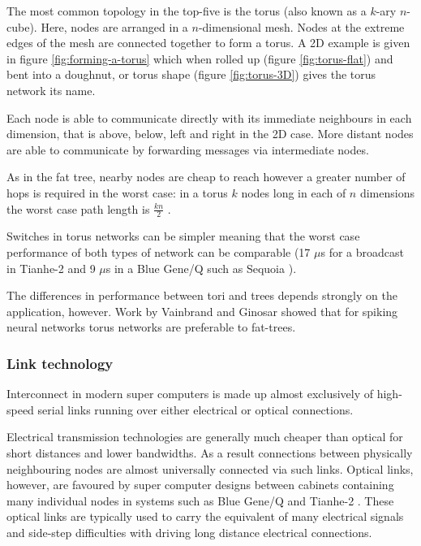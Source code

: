 				The most common topology in the top-five is the torus (also known as a
				$k$-ary $n$-cube). Here, nodes are arranged in a $n$-dimensional mesh.
				Nodes at the extreme edges of the mesh are connected together to form a
				torus. A 2D example is given in figure \ref{fig:forming-a-torus} which
				when rolled up (figure \ref{fig:torus-flat}) and bent into a doughnut,
				or torus shape (figure \ref{fig:torus-3D}) gives the torus network its
				name.
				
				Each node is able to communicate directly with its immediate neighbours
				in each dimension, that is above, below, left and right in the 2D case.
				More distant nodes are able to communicate by forwarding messages via
				intermediate nodes.
				
				As in the fat tree, nearby nodes are cheap to reach however a greater
				number of hops is required in the worst case: in a torus $k$ nodes long
				in each of $n$ dimensions the worst case path length is $\frac{kn}{2}$
				\cite{dally04}.
				
				Switches in torus networks can be simpler meaning that the worst case
				performance of both types of network can be comparable (17 $\mu$s for a
				broadcast in Tianhe-2 and 9 $\mu$s in a Blue Gene/Q such as Sequoia
				\cite{dongarra13,morozov12}).
				
				The differences in performance between tori and trees depends strongly
				on the application, however. Work by Vainbrand and Ginosar
				\cite{vainbrand11} showed that for spiking neural networks torus
				networks are preferable to fat-trees.
			
			\subsubsection{Link technology}
				
				
				Interconnect in modern super computers is made up almost exclusively of
				high-speed serial links running over either electrical or optical
				connections.
				
				Electrical transmission technologies are generally much cheaper than
				optical for short distances and lower bandwidths. As a result
				connections between physically neighbouring nodes are almost universally
				connected via such links.  Optical links, however, are favoured by super
				computer designs between cabinets containing many individual nodes in
				systems such as Blue Gene/Q and Tianhe-2 \cite{dongarra13,prickett10}.
				These optical links are typically used to carry the equivalent of many
				electrical signals and side-step difficulties with driving long distance
				electrical connections.
				
